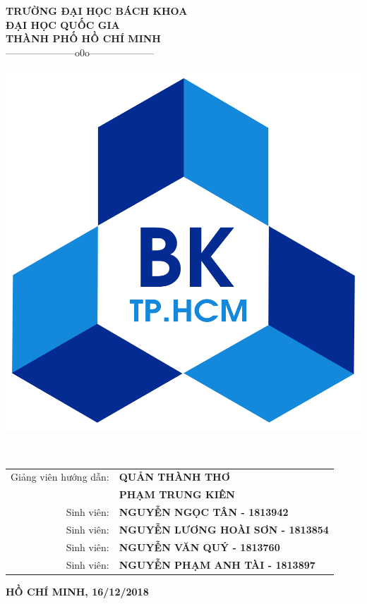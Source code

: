 \documentclass[12pt,a4paper]{report}
\begin{document}
\fontsize{13pt}{18pt}\selectfont %

\setlength{\baselineskip}{18truept}

\begin{titlepage} %

\begin{center}

{\large\bf TRƯỜNG ĐẠI HỌC BÁCH KHOA }\\
{\large\bf ĐẠI HỌC QUỐC GIA }\\
{\large\bf THÀNH PHỐ HỒ CHÍ MINH }\\

{———————o0o——————–}

\vskip 1cm



	\includegraphics[width=0.3\linewidth]{logg}

	\label{fig:logg}


\vskip 1cm

{\Large\bf \textbf{\color{blue}{BÁO CÁO BÀI TẬP LỚN NHẬP MÔN ĐIỆN TOÁN}}}\\

\vskip 1cm

{\bf {\it \color{blue}{Nhóm:}} \color{blue}{NHÓM 1 }} \hspace{0.5cm} {\bf {\it \color{blue}{Lớp:}} \color{blue}{L10}}

\vskip 3cm

\begin{tabular}{r l}

Giảng viên hướng dẫn:&{\bf QUẢN THÀNH THƠ }\\ &{\bf PHẠM TRUNG KIÊN}\\
[0.5cm]

Sinh viên:&{\bf NGUYỄN NGỌC TÂN - 1813942}\\
Sinh viên:&{\bf NGUYỄN LƯƠNG HOÀI SƠN - 1813854}\\
Sinh viên:&{\bf NGUYỄN VĂN QUÝ - 1813760}\\
Sinh viên:&{\bf NGUYỄN PHẠM ANH TÀI - 1813897}\\
[0.5cm]



\end{tabular}

\vfill

{\bf HỒ CHÍ MINH, 16/12/2018}

\end{center}

\end{titlepage}
\end{document}
